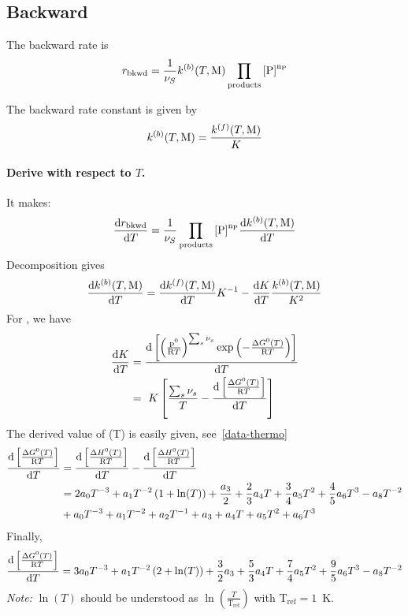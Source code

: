 \subsection{Backward}

The backward rate is
\begin{equation}
\rateb = \frac{1}{\scoef[S]}\rateConsb\prodProd
\end{equation}

The backward rate constant is given by
\begin{equation}
\rateConsb = \frac{\rateConsf}{\Eqconst}
\end{equation}

\paragraph{Derive with respect to $T$.}
It makes:
\begin{equation}
\doverdT{\rateb} = \frac{1}{\scoef[S]}\prodProd\doverdT{\rateConsb}
\end{equation}
Decomposition gives
\begin{equation}
\doverdT{\rateConsb} = \doverdT{\rateConsf}\Eqconst^{-1} - \doverdT{\Eqconst}\frac{\rateConsb}{\Eqconst^{2}}
\label{rateb-decomp}
\end{equation}
For \Eqconst, we have
\begin{equation}
\begin{split}
\doverdT{\Eqconst} &= \doverdT{\left[\left(\frac{\pz}{\Rg T}\right)^{\sum_s \scoef[s]} \exp\left(-\frac{\DgibbsZ(T)}{\Rg T}\right)\right]} \\
                   &= \Eqconst\left[\frac{\sum_s\scoef[s]}{T} - \doverdT{\left[\frac{\DgibbsZ(T)}{\Rg T}\right]}\right]
\end{split}
\end{equation}
The derived value of \DgibbsZ(T) is easily given, see~\ref{data-thermo}
\begin{equation}
\begin{split}
\doverdT{\left[\frac{\DgibbsZ(T)}{\Rg T}\right]} 
        &= \doverdT{\left[\frac{\DenthZ(T)}{\Rg T}\right]} - \doverdT{\left[\frac{\DenthZ(T)}{\Rg T}\right]} \\
        &= 2\tc{0}T^{-3} + \tc{1}T^{-2}\left(1+\ln(T)\right) + \frac{\tc{3}}{2} + \frac{2}{3}\tc{4}T + \frac{3}{4}\tc{5}T^{2} + \frac{4}{5}\tc{6}T^3 - \tc{8}T^{-2}\\
        &+ \tc{0}T^{-3} + \tc{1}T^{-2} + \tc{2}T^{-1} + \tc{3} + \tc{4}T + \tc{5} T^{2} + \tc{6} T^{3}
\end{split}
\end{equation}
Finally,
\begin{equation}
\doverdT{\left[\frac{\DgibbsZ(T)}{\Rg T}\right]} =
        3\tc{0}T^{-3} + \tc{1} T^{-2} \left(2 + \ln(T)\right) + \frac{3}{2} \tc{3} + \frac{5}{3} \tc{4} T
        + \frac{7}{4}\tc{5} T^2 + \frac{9}{5}\tc{6} T^3 - \tc{8} T^{-2}
\end{equation}
\emph{Note:} $\ln(T)$ should be understood as $\ln\left(\frac{T}{\mathrm{T_{ref}}}\right)$ with $\mathrm{T_{ref}} = 1$~K.

